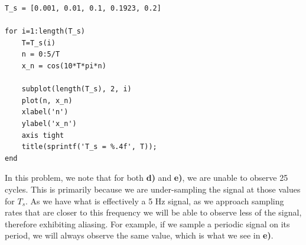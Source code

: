\documentclass[12pt]{article}
\begin{document}
\begin{enumerate}[label=\textbf{\alph*)}, leftmargin=2.6em]
\begin{verbatim}
T_s = [0.001, 0.01, 0.1, 0.1923, 0.2]

for i=1:length(T_s)
    T=T_s(i)
    n = 0:5/T
    x_n = cos(10*T*pi*n)

    subplot(length(T_s), 2, i)
    plot(n, x_n)
    xlabel('n')
    ylabel('x_n')
    axis tight
    title(sprintf('T_s = %.4f', T));
end
\end{verbatim}
\end{enumerate}
In this problem, we note that for both \textbf{d)} and \textbf{e)}, we are unable to observe 25 cycles. This is primarily because we are under-sampling the signal at those values for $T_s$. As we have what is effectively a 5 Hz signal, as we approach sampling rates that are closer to this frequency we will be able to observe less of the signal, therefore exhibiting aliasing. For example, if we sample a periodic signal on its period, we will always observe the same value, which is what we see in \textbf{e)}.
\end{document}
